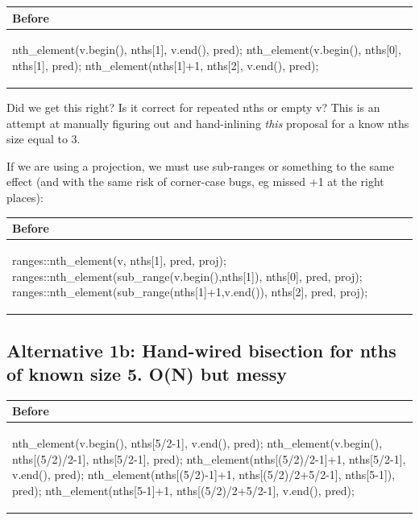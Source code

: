 \hspace{3ex}\begin{tabular}{|l|} 
  \hline 
  \textbf{Before} \\
  \hline 
\begin{codeblock} 
nth_element(v.begin(), nths[1], v.end(), pred);
nth_element(v.begin(), nths[0], nths[1], pred);
nth_element(nths[1]+1, nths[2], v.end(), pred);
\end{codeblock} 
\\
\hline 
\end{tabular} 

Did we get this right? Is it correct for repeated nths or empty v?
This is an attempt at manually figuring out and hand-inlining \emph{this} proposal for a know nths size equal to 3.

If we are using a projection, we must use sub-ranges or something to the same effect (and with the same risk of corner-case bugs, eg missed +1 at the right places):

\hspace{3ex}\begin{tabular}{|l|} 
  \hline 
  \textbf{Before} \\
  \hline 
\begin{codeblock} 
ranges::nth_element(v, nths[1], pred, proj);
ranges::nth_element(sub_range(v.begin(),nths[1]), nths[0], pred, proj);
ranges::nth_element(sub_range(nths[1]+1,v.end()), nths[2], pred, proj);
\end{codeblock} 
\\
\hline 
\end{tabular} 
\subsection*{Alternative 1b: Hand-wired bisection for nths of known size 5. O(N) but messy}

\hspace{3ex}\begin{tabular}{|l|} 
  \hline 
  \textbf{Before} \\
  \hline 
\begin{codeblock} 
nth_element(v.begin(), nths[5/2-1], v.end(), pred);
nth_element(v.begin(), nths[(5/2)/2-1], nths[5/2-1], pred);
nth_element(nths[(5/2)/2-1]+1, nths[5/2-1], v.end(), pred);
nth_element(nths[(5/2)-1]+1, nths[(5/2)/2+5/2-1], nths[5-1]), pred);
nth_element(nths[5-1]+1, nths[(5/2)/2+5/2-1], v.end(), pred);
\end{codeblock} 
\\
\hline 
\end{tabular} 

